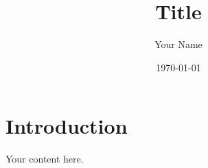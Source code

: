 \documentclass[12pt,letterpaper]{article}
\title{Title}
\author{Your Name}
\date{\today}
\theoremstyle{definition}
\theoremstyle{remark}
\begin{document}
\maketitle

\section{Introduction}

Your content here.
\end{document}
